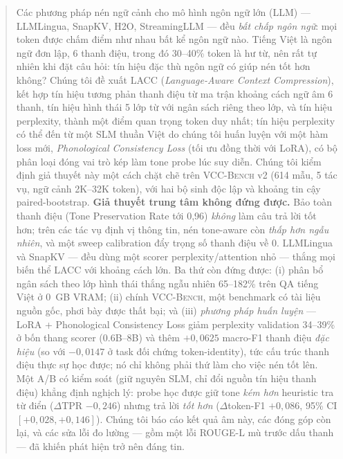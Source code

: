 \documentclass[runningheads]{llncs}
\newcommand{\method}[1]{\textsc{#1}}
\begin{document}
\begin{abstract}
Các phương pháp nén ngữ cảnh cho mô hình ngôn ngữ lớn (LLM) --- LLMLingua, SnapKV, H2O, StreamingLLM --- đều \emph{bất chấp ngôn ngữ}: mọi token được chấm điểm như nhau bất kể ngôn ngữ nào. Tiếng Việt là ngôn ngữ đơn lập, 6 thanh điệu, trong đó 30--40\% token là hư từ, nên rất tự nhiên khi đặt câu hỏi: tín hiệu đặc thù ngôn ngữ có giúp nén tốt hơn không? Chúng tôi đề xuất \method{LACC} (\emph{Language-Aware Context Compression}), kết hợp tín hiệu tương phản thanh điệu từ ma trận khoảng cách ngữ âm 6 thanh, tín hiệu hình thái 5 lớp từ với ngân sách riêng theo lớp, và tín hiệu perplexity, thành một điểm quan trọng token duy nhất; tín hiệu perplexity có thể đến từ một SLM thuần Việt do chúng tôi huấn luyện với một hàm loss mới, \emph{Phonological Consistency Loss} (tối ưu đồng thời với LoRA), có bộ phân loại đóng vai trò kép làm tone probe lúc suy diễn. Chúng tôi kiểm định giả thuyết này một cách chặt chẽ trên \method{VCC-Bench} v2 (614 mẫu, 5 tác vụ, ngữ cảnh 2K--32K token), với hai bộ sinh độc lập và khoảng tin cậy paired-bootstrap. \textbf{Giả thuyết trung tâm không đứng được.} Bảo toàn thanh điệu (Tone Preservation Rate tới 0,96) \emph{không} làm câu trả lời tốt hơn; trên các tác vụ định vị thông tin, nén tone-aware còn \emph{thấp hơn ngẫu nhiên}, và một sweep calibration đẩy trọng số thanh điệu về 0. LLMLingua và SnapKV --- đều dùng một scorer perplexity/attention nhỏ --- thắng mọi biến thể \method{LACC} với khoảng cách lớn. Ba thứ còn đứng được: (i) phân bổ ngân sách theo lớp hình thái thắng ngẫu nhiên 65--182\% trên QA tiếng Việt ở 0~GB VRAM; (ii) chính \method{VCC-Bench}, một benchmark có tài liệu nguồn gốc, phơi bày được thất bại; và (iii) \emph{phương pháp huấn luyện} --- LoRA + Phonological Consistency Loss giảm perplexity validation 34--39\% ở bốn thang scorer (0.6B--8B) và thêm $+0{,}0625$ macro-F1 thanh điệu \emph{đặc hiệu} (so với $-0{,}0147$ ở task đối chứng token-identity), tức cấu trúc thanh điệu thực sự học được; nó chỉ không phải thứ làm cho việc nén tốt lên. Một A/B có kiểm soát (giữ nguyên SLM, chỉ đổi nguồn tín hiệu thanh điệu) khẳng định nghịch lý: probe học được giữ tone \emph{kém hơn} heuristic tra từ điển ($\Delta$TPR $-0{,}246$) nhưng trả lời \emph{tốt hơn} ($\Delta$token-F1 $+0{,}086$, 95\% CI $[+0{,}028,+0{,}146]$). Chúng tôi báo cáo kết quả âm này, các đóng góp còn lại, và các sửa lỗi đo lường --- gồm một lỗi ROUGE-L mù trước dấu thanh --- đã khiến phát hiện trở nên đáng tin.

\end{abstract}
\end{document}
